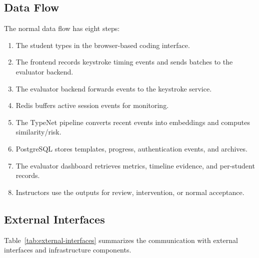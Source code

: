 \subsection{Data Flow}
\label{subsec:data-flow}

The normal data flow has eight steps:

\begin{enumerate}
  \item The student types in the browser-based coding interface.
  \item The frontend records keystroke timing events and sends batches to the evaluator backend.
  \item The evaluator backend forwards events to the keystroke service.
  \item Redis buffers active session events for monitoring.
  \item The TypeNet pipeline converts recent events into embeddings and computes similarity/risk.
  \item PostgreSQL stores templates, progress, authentication events, and archives.
  \item The evaluator dashboard retrieves metrics, timeline evidence, and per-student records.
  \item Instructors use the outputs for review, intervention, or normal acceptance.
\end{enumerate}

\subsection{External Interfaces}
\label{subsec:external-interfaces}

Table~\ref{tab:external-interfaces} summarizes the communication with external interfaces and infrastructure components.

